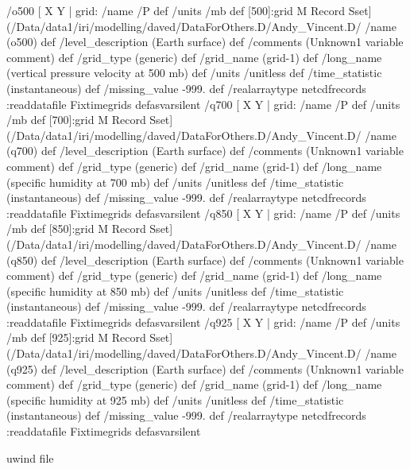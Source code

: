 \begin{ingrid}
/o500{
[  X Y | grid:
       /name /P def
       /units /mb def
       [500]:grid  M Record Sset] (/Data/data1/iri/modelling/daved/DataForOthers.D/Andy_Vincent.D/%
/name (o500) def
 /level_description (Earth surface) def
 /comments (Unknown1 variable comment) def
 /grid_type (generic) def
 /grid_name (grid-1) def
 /long_name (vertical pressure velocity at 500 mb) def
 /units /unitless def
 /time_statistic (instantaneous) def
 /missing_value -999. def
 /realarraytype netcdfrecords :readdatafile Fixtimegrids
}defasvarsilent
 /q700{
[  X Y | grid:
       /name /P def
       /units /mb def
       [700]:grid M Record Sset] (/Data/data1/iri/modelling/daved/DataForOthers.D/Andy_Vincent.D/%
/name (q700) def
 /level_description (Earth surface) def
 /comments (Unknown1 variable comment) def
 /grid_type (generic) def
 /grid_name (grid-1) def
 /long_name (specific humidity at 700 mb) def
 /units /unitless def
 /time_statistic (instantaneous) def
 /missing_value -999. def
 /realarraytype netcdfrecords :readdatafile Fixtimegrids
}defasvarsilent
 /q850{
[  X Y | grid:
       /name /P def
       /units /mb def
       [850]:grid M Record Sset] (/Data/data1/iri/modelling/daved/DataForOthers.D/Andy_Vincent.D/%
/name (q850) def
 /level_description (Earth surface) def
 /comments (Unknown1 variable comment) def
 /grid_type (generic) def
 /grid_name (grid-1) def
 /long_name (specific humidity at 850 mb) def
 /units /unitless def
 /time_statistic (instantaneous) def
 /missing_value -999. def
 /realarraytype netcdfrecords :readdatafile Fixtimegrids
}defasvarsilent
 /q925{
[  X Y | grid:
       /name /P def
       /units /mb def
       [925]:grid M Record Sset] (/Data/data1/iri/modelling/daved/DataForOthers.D/Andy_Vincent.D/%
/name (q925) def
 /level_description (Earth surface) def
 /comments (Unknown1 variable comment) def
 /grid_type (generic) def
 /grid_name (grid-1) def
 /long_name (specific humidity at 925 mb) def
 /units /unitless def
 /time_statistic (instantaneous) def
 /missing_value -999. def
 /realarraytype netcdfrecords :readdatafile Fixtimegrids
}defasvarsilent
\end{ingrid}
uwind file
